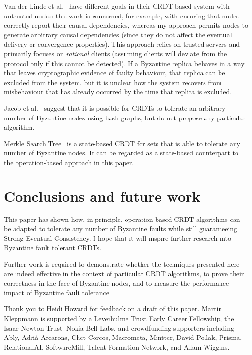 \documentclass[sigplan,review]{acmart}
\begin{document}
Van der Linde et al.~\cite{vanderLinde:2020} have different goals in their CRDT-based system with untrusted nodes: this work is concerned, for example, with ensuring that nodes correctly report their causal dependencies, whereas my approach permits nodes to generate arbitrary causal dependencies (since they do not affect the eventual delivery or convergence properties).
This approach relies on trusted servers and primarily focuses on \emph{rational} clients (assuming clients will deviate from the protocol only if this cannot be detected).
If a Byzantine replica behaves in a way that leaves cryptographic evidence of faulty behaviour, that replica can be excluded from the system, but it is unclear how the system recovers from misbehaviour that has already occurred by the time that replica is excluded.

Jacob et al.~\cite{Jacob:2021} suggest that it is possible for CRDTs to tolerate an arbitrary number of Byzantine nodes using hash graphs, but do not propose any particular algorithm.

Merkle Search Tree~\cite{Auvolat:2019} is a state-based CRDT for sets that is able to tolerate any number of Byzantine nodes.
It can be regarded as a state-based counterpart to the operation-based approach in this paper.

\section{Conclusions and future work}\label{sec:conclusions}

This paper has shown how, in principle, operation-based CRDT algorithms can be adapted to tolerate any number of Byzantine faults while still guaranteeing Strong Eventual Consistency.
I hope that it will inspire further research into Byzantine fault tolerant CRDTs.

Further work is required to demonstrate whether the techniques presented here are indeed effective in the context of particular CRDT algorithms, to prove their correctness in the face of Byzantine nodes, and to measure the performance impact of Byzantine fault tolerance.

\begin{acks}
Thank you to Heidi Howard for feedback on a draft of this paper.
Martin Kleppmann is supported by a Leverhulme Trust Early Career Fellowship, the Isaac Newton Trust, Nokia Bell Labs, and crowdfunding supporters including Ably, Adrià Arcarons, Chet Corcos, Macrometa, Mintter, David Pollak, Prisma, RelationalAI, SoftwareMill, Talent Formation Network, and Adam Wiggins.
\end{acks}



\end{document}
